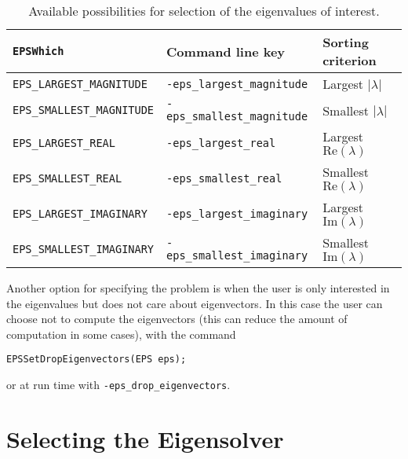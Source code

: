 \begin{table}[t]
\centering
{\small \begin{tabular}{lll}
\texttt{EPSWhich}                  & Command line key                   & Sorting criterion \\\hline
\texttt{EPS\_LARGEST\_MAGNITUDE}   & \texttt{-eps\_largest\_magnitude}  & Largest $|\lambda|$ \\
\texttt{EPS\_SMALLEST\_MAGNITUDE}  & \texttt{-eps\_smallest\_magnitude} & Smallest $|\lambda|$ \\
\texttt{EPS\_LARGEST\_REAL}        & \texttt{-eps\_largest\_real}       & Largest $\mathrm{Re}(\lambda)$ \\
\texttt{EPS\_SMALLEST\_REAL}       & \texttt{-eps\_smallest\_real}      & Smallest $\mathrm{Re}(\lambda)$ \\
\texttt{EPS\_LARGEST\_IMAGINARY}   & \texttt{-eps\_largest\_imaginary}  & Largest $\mathrm{Im}(\lambda)$\footnotemark \\
\texttt{EPS\_SMALLEST\_IMAGINARY}  & \texttt{-eps\_smallest\_imaginary} & Smallest $\mathrm{Im}(\lambda)$\addtocounter{footnote}{-1}\footnotemark \\
\end{tabular} }
\caption{\label{tab:portion}Available possibilities for selection of the eigenvalues of interest.}
\end{table}


	Another option for specifying the problem is when the user is only interested in the eigenvalues but does not care about eigenvectors. In this case the user can choose not to compute the eigenvectors (this can reduce the amount of computation in some cases), with the command
	\begin{Verbatim}[fontsize=\small]
	EPSSetDropEigenvectors(EPS eps);
	\end{Verbatim}
or at run time with \Verb!-eps_drop_eigenvectors!.

\section{Selecting the Eigensolver}

